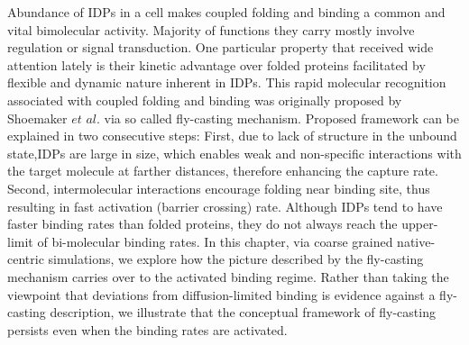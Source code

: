 \documentclass[../talant.diss.submit.tex]{subfiles}
\begin{document}
Abundance of IDPs in a cell makes coupled folding and binding a common and vital bimolecular activity.
Majority of functions they carry mostly involve regulation or signal transduction. \cite{gsponer:09r}
One particular property that received wide attention lately is their kinetic advantage over
folded proteins facilitated by flexible and dynamic nature inherent in IDPs. This rapid molecular recognition
associated with coupled folding and binding was originally proposed by Shoemaker $\textit{et~al.}$
via so called fly-casting mechanism\cite{shoeportman:00}. Proposed framework can be explained in two consecutive
steps: First, due to lack of structure in the unbound state,IDPs are large in size, which enables weak and
non-specific interactions with the target molecule at farther distances, therefore enhancing the capture rate.
Second, intermolecular interactions encourage folding near binding site, thus resulting in fast
activation (barrier crossing) rate.
Although IDPs tend to have faster binding rates than folded proteins, they do not always reach
the upper-limit of bi-molecular binding rates.\cite{rogers:13} In this chapter, via coarse grained native-centric
simulations, we explore how the picture described by the fly-casting mechanism carries over to the activated binding
regime. Rather than taking the viewpoint that deviations from diffusion-limited binding is evidence against a
fly-casting description\cite{huang:09}, we illustrate that the conceptual framework of fly-casting
persists even when the binding rates are activated.
\end{document}
